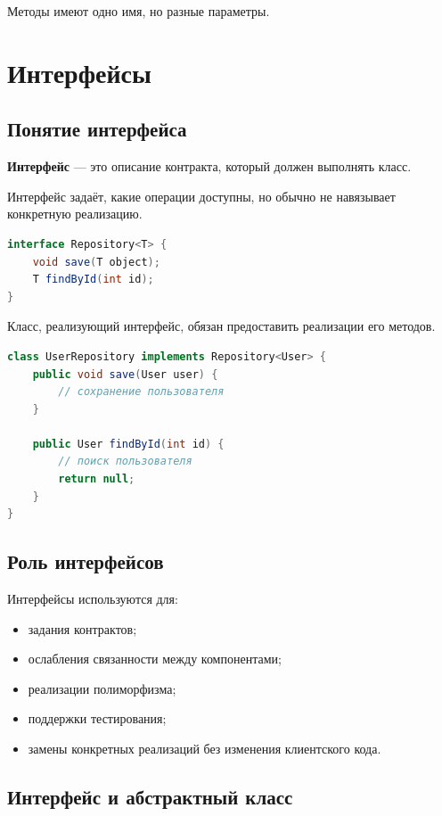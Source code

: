 \documentclass[12pt,a4paper]{article}
\begin{document}
Методы имеют одно имя, но разные параметры.

\section{Интерфейсы}

\subsection{Понятие интерфейса}

\textbf{Интерфейс} --- это описание контракта, который должен выполнять класс.

Интерфейс задаёт, какие операции доступны, но обычно не навязывает конкретную реализацию.

\begin{lstlisting}[language=Java,caption={Интерфейс}]
interface Repository<T> {
    void save(T object);
    T findById(int id);
}
\end{lstlisting}

Класс, реализующий интерфейс, обязан предоставить реализации его методов.

\begin{lstlisting}[language=Java,caption={Реализация интерфейса}]
class UserRepository implements Repository<User> {
    public void save(User user) {
        // сохранение пользователя
    }

    public User findById(int id) {
        // поиск пользователя
        return null;
    }
}
\end{lstlisting}

\subsection{Роль интерфейсов}

Интерфейсы используются для:
\begin{itemize}
    \item задания контрактов;
    \item ослабления связанности между компонентами;
    \item реализации полиморфизма;
    \item поддержки тестирования;
    \item замены конкретных реализаций без изменения клиентского кода.
\end{itemize}

\subsection{Интерфейс и абстрактный класс}
\end{document}
